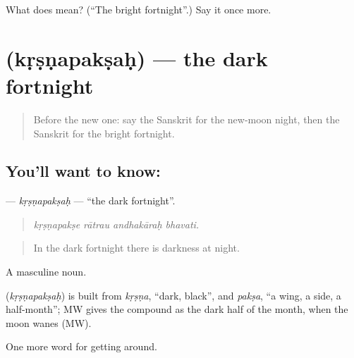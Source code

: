 \begin{tcolorbox}[breakable,colback=teal!4,colframe=teal!35!black,title={Before you move on}]
What does  mean? (\textquotedblleft{}The bright fortnight\textquotedblright{}.) Say it once more.
\end{tcolorbox}
\section[\texorpdfstring{\sk{कृष्णपक्षः} (kṛṣṇapakṣaḥ)}{कृष्णपक्षः (kṛṣṇapakṣaḥ)}]{ (kṛṣṇapakṣaḥ) — the dark fortnight}

\label{lesson:SA-C444-krsnapaksah}



\begin{quote}
Before the new one: say the Sanskrit for the new-moon night, then the Sanskrit for the bright fortnight.
\end{quote}

\subsection*{You'll want to know: }
\textbf{} — \emph{kṛṣṇapakṣaḥ} — \textquotedblleft{}the dark fortnight\textquotedblright{}.

\begin{quote}
   
\end{quote}

\begin{quote}
\emph{kṛṣṇapakṣe rātrau andhakāraḥ bhavati.}
\end{quote}

\begin{quote}
In the dark fortnight there is darkness at night.
\end{quote}

A masculine noun.

\begin{cousinweb}
\textbf{} (\emph{kṛṣṇapakṣaḥ}) is built from \emph{kṛṣṇa}, \textquotedblleft{}dark, black\textquotedblright{}, and \emph{pakṣa}, \textquotedblleft{}a wing, a side, a half-month\textquotedblright{}; MW gives the compound as the dark half of the month, when the moon wanes (MW).
\end{cousinweb}

\begin{grammarlens}[title={What you've built}]
One more word for getting around.
\end{grammarlens}

